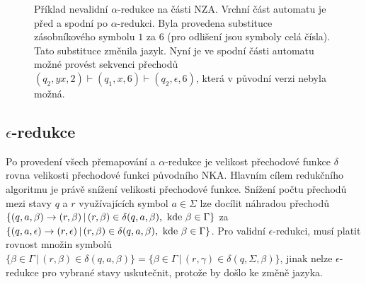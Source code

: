           \begin{figure}[h]
            \centering
            \captionsetup{justification=justified}
            \caption{Příklad nevalidní $\alpha$-redukce na části NZA. Vrchní část automatu je před a spodní po $\alpha$-redukci. Byla provedena substituce zásobníkového symbolu $1$ za $6$ (pro odlišení jsou symboly celá čísla). Tato substituce změnila jazyk. Nyní je ve spodní části automatu možné provést sekvenci přechodů $(q_2, yx, 2) \vdash (q_1, x, 6) \vdash (q_2, \epsilon, 6)$, která v původní verzi nebyla možná.}
            \label{betaErrAtm}
          \end{figure}

    \subsection{$\epsilon$-redukce}
        Po provedení všech přemapování a $\alpha$-redukce je velikost přechodové funkce $\delta$ rovna velikosti přechodové funkci původního NKA. Hlavním cílem redukčního algoritmu je právě snížení velikosti přechodové funkce. Snížení počtu přechodů mezi stavy $q$ a $r$ využívajících symbol $a \in \Sigma$ lze docílit náhradou přechodů $\{(q, a, \beta) \rightarrow (r, \beta)\,|\, (r, \beta) \in \delta(q, a, \beta),\textnormal{ kde } \beta \in \Gamma\}$ za $\{(q, a, \epsilon) \rightarrow (r, \epsilon)\,|\, (r, \beta) \in \delta(q, a, \beta),\textnormal{ kde } \beta \in \Gamma\}$. Pro validní $\epsilon$-redukci, musí platit rovnost množin symbolů $\{\beta \in \Gamma\,|\, (r, \beta) \in \delta(q, a, \beta)\} = \{\beta \in \Gamma\,|\, (r, \gamma) \in \delta(q, \Sigma, \beta)\}$, jinak nelze $\epsilon$-redukce pro vybrané stavy uskutečnit, protože by došlo ke změně jazyka.

